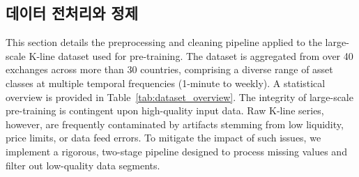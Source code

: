 \begin{table}[t]
\centering
\small

\setlength{\tabcolsep}{4pt} %
\caption{저품질 데이터 필터링 파이프라인의 주기별 파라미터. 임계값은 서로 다른 시간 주기의 고유한 동학을 반영하도록 조정된다.}
\label{tab:cleaning_parameters}
\end{table}

\subsection{데이터 전처리와 정제}
\label{appendix:data_cleaning}

This section details the preprocessing and cleaning pipeline applied to the large-scale K-line dataset used for pre-training. The dataset is aggregated from over 40 exchanges across more than 30 countries, comprising a diverse range of asset classes at multiple temporal frequencies (1-minute to weekly). A statistical overview is provided in Table~\ref{tab:dataset_overview}. The integrity of large-scale pre-training is contingent upon high-quality input data. Raw K-line series, however, are frequently contaminated by artifacts stemming from low liquidity, price limits, or data feed errors. To mitigate the impact of such issues, we implement a rigorous, two-stage pipeline designed to process missing values and filter out low-quality data segments.

